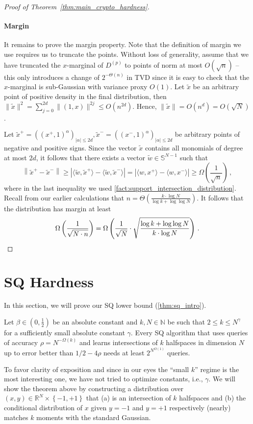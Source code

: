 \documentclass{theoretics}
\newcommand{\Paren}[1]{\left(#1\right)}
\newcommand{\Abs}[1]{\left\lvert#1\right\rvert}
\newcommand{\card}[1]{\lvert#1\rvert}
\newcommand{\Set}[1]{\left\{#1\right\}}
\newcommand{\norm}[1]{\lVert#1\rVert}
\newcommand{\Norm}[1]{\left\lVert#1\right\rVert}
\newcommand{\iprod}[1]{\langle#1\rangle}
\newcommand{\N}{\mathbb N}
\newcommand{\R}{\mathbb R}
\renewcommand{\leq}{\leqslant}
\renewcommand{\geq}{\geqslant}
\begin{document}
\begin{proof}[Proof of Theorem~\ref{thm:main_crypto_hardness}]
    \paragraph{Margin}
    It remains to prove the margin property.
    Note that the definition of margin we use requires us to truncate the points.
    Without loss of generality, assume that we have truncated the $x$-marginal of $D^{(p)}$ to points of norm at most $O(\sqrt{n})$ -- this only introduces a change of $2^{-\Theta(n)}$ in TVD since it is easy to check that the $x$-marginal is sub-Gaussian with variance proxy $O(1)$.
    Let $\tilde{x}$ be an arbitrary point of positive density in the final distribution, then $\norm{\tilde{x}}^2 = \sum_{j=0}^{2d} \norm{(1,x)}^{2j} \leq O(n^{2d})$. Hence, $\norm{\tilde{x}} = O(n^{d}) = O(\sqrt{N})$.

    Let $\tilde{x}^+ = ((x^+,1)^\alpha)_{\card{\alpha} \leq 2d},\tilde{x}^- = ((x^-,1)^\alpha)_{\card{\alpha} \leq 2d}$ be arbitrary points of negative and positive signs.
    Since the vector $\tilde{x}$ contains all monomials of degree at most $2d$, it follows that there exists a vector $\tilde{w} \in \mathbb{S}^{N-1}$ such that
    \[
        \Norm{\tilde{x}^+ - \tilde{x}^-} \geq \Abs{\iprod{\tilde{w},\tilde{x}^+}-\iprod{\tilde{w},\tilde{x}^-}} = \Abs{\iprod{w, x^+ }- \iprod{w, x^-}} \geq \Omega\Paren{\frac 1 {\sqrt{n}}} \,,
    \]
    where in the last inequality we used \cref{fact:support_intersection_distribution}.
    Recall from our earlier calculations that $n = \Theta(\tfrac {k \cdot \log N}{\log k  + \log\log N})$.
    It follows that the distribution has margin at least
    \[
        \Omega\Paren{\frac 1 {\sqrt{N \cdot n}}} = \Omega\Paren{\frac 1 {\sqrt{N}} \cdot \sqrt{\frac {\log k + \log \log N} {k \cdot \log N}}} \,.\qedhere
    \]
\end{proof}

\section{SQ Hardness}
\label{sec:sq_hardness}

In this section, we will prove our SQ lower bound (\cref{thm:sq_intro}).
\begin{theorem}
    \label{thm:main_sq_hardness}
    Let $\beta \in(0,\tfrac 1 2)$ be an absolute constant and $k,N \in \N$ be such that $2 \leq k \leq N^\gamma$ for a sufficiently small absolute constant $\gamma$.
    Every SQ algorithm that uses queries of accuracy $\rho = N^{- \Omega(k)}$ and learns intersections of $k$ halfspaces in dimension $N$ up to error better than $1/2 - 4 \rho$ needs at least $2^{N^{\Omega(1)}}$ queries.
\end{theorem}
To favor clarity of exposition and since in our eyes the ``small $k$'' regime is the most interesting one, we have not tried to optimize constants, i.e., $\gamma$.
We will show the theorem above by constructing a distribution over $(x,y) \in \R^N \times \Set{-1,+1}$ that (a) is an intersection of $k$ halfspaces and (b) the conditional distribution of $x$ given $y = -1$ and $y = +1$ respectively (nearly) matches $k$ moments with the standard Gaussian.
\end{document}

